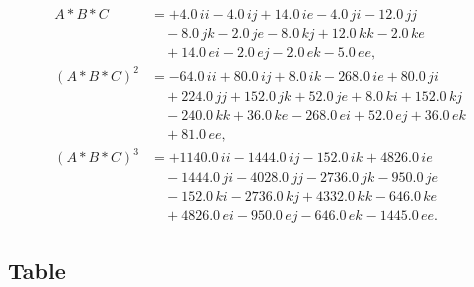\documentclass[12pt]{article}
\begin{document}
\clearpage
 

\begin{align*}
  A*B*C &= +4.0\,ii - 4.0\,ij + 14.0\,ie - 4.0\,ji - 12.0\,jj \\
       &\quad - 8.0\,jk - 2.0\,je - 8.0\,kj + 12.0\,kk - 2.0\,ke \\
       &\quad + 14.0\,ei - 2.0\,ej - 2.0\,ek - 5.0\,ee, \\
  (A*B*C)^2 &= -64.0\,ii + 80.0\,ij + 8.0\,ik - 268.0\,ie + 80.0\,ji \\
           &\quad + 224.0\,jj + 152.0\,jk + 52.0\,je + 8.0\,ki + 152.0\,kj \\
           &\quad - 240.0\,kk + 36.0\,ke - 268.0\,ei + 52.0\,ej + 36.0\,ek \\
           &\quad + 81.0\,ee, \\
  (A*B*C)^3 &= +1140.0\,ii - 1444.0\,ij - 152.0\,ik + 4826.0\,ie \\
           &\quad - 1444.0\,ji - 4028.0\,jj - 2736.0\,jk - 950.0\,je \\
           &\quad - 152.0\,ki - 2736.0\,kj + 4332.0\,kk - 646.0\,ke \\
           &\quad + 4826.0\,ei - 950.0\,ej - 646.0\,ek - 1445.0\,ee.
\end{align*}

\subsection{Table}
\end{document}
